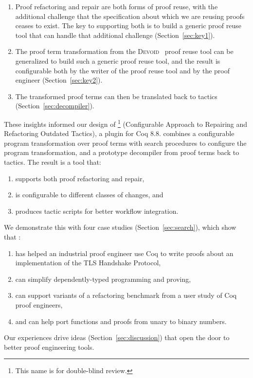 \begin{enumerate}
\item Proof refactoring and repair are both forms of proof reuse, with the additional
challenge that the specification about which
we are reusing proofs ceases to exist.
The key to supporting both is to build a generic proof reuse
tool that can handle that additional challenge (Section~\ref{sec:key1}). 
\item The proof term transformation from the \textsc{Devoid}~\cite{Ringer2019} proof reuse tool can be generalized
to build such a generic proof reuse tool, and the result is configurable both by the writer of the proof reuse tool and by the 
proof engineer (Section~\ref{sec:key2}).
\item The transformed proof terms can then be translated back to tactics (Section~\ref{sec:decompiler}).
\end{enumerate}

These insights informed our design of 
\toolname\footnote{This name is for double-blind review.} (Configurable Approach to Repairing and Refactoring Outdated Tactics), a plugin for Coq 8.8.
\toolname combines a configurable program transformation over proof terms %
with search procedures to configure the program transformation,
and a prototype decompiler from proof terms back to tactics.
The result is a tool that:

\begin{enumerate}
\item supports both proof refactoring and repair,
\item is configurable to different classes of changes, and
\item produces tactic scripts for better workflow integration.
\end{enumerate}
We demonstrate this with four case studies (Section~\ref{sec:search}), which show that \toolname:

\begin{enumerate}
\item has helped an industrial proof engineer use Coq to write proofs about an implementation
of the TLS Handshake Protocol,
\item can simplify dependently-typed programming and proving,
\item can support variants of a refactoring benchmark from a user study of Coq proof engineers,
\item and can help port functions and proofs from unary to binary numbers.
\end{enumerate}
Our experiences drive ideas (Section~\ref{sec:discussion}) that open the door to better proof engineering tools.

